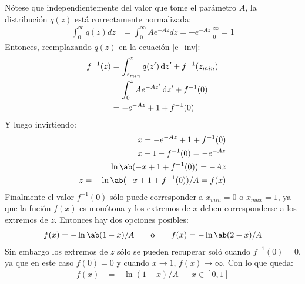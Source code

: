\documentclass[12pt]{article}
\begin{document}
Nótese que independientemente del valor que tome el parámetro $A$, la
distribución $q(z)$ está correctamente normalizada:
 \begin{align}
  \int_{0}^{\infty}q(z)dz&=\int_{0}^{\infty}Ae^{-Az}dz=-e^{-Az}\bigg\rvert_0^\infty=1
\end{align}  
Entonces, reemplazando $q(z)$ en la ecuación \ref{e_inv}:
\begin{align}
  f^{-1}(z)&=\int_{z_{min}}^{z} q(z') \odif{z'}+f^{-1}(z_{min})\\
            &=\int_{0}^{z} Ae^{-Az'} \odif{z'}+f^{-1}(0)\\
            &=-e^{-Az}+1+f^{-1}(0)
\end{align} 
Y luego invirtiendo:
\begin{align}
  x=-e^{-Az}+1+f^{-1}(0)\\
  x-1-f^{-1}(0)=-e^{-Az}\\
  \ln\ab(-x+1+f^{-1}(0))=-Az\\
  z=-\ln\ab(-x+1+f^{-1}(0))/A=f(x)
\end{align}
Finalmente el valor $f^{-1}(0)$ sólo puede corresponder a $x_{min}=0$ o
$x_{max}=1$, ya que la fución $f(x)$ es monótona y los extremos de $x$ deben
corresponderse a los extremos de $z$. Entonces hay dos opciones posibles:
\begin{align}
   f(x)=-\ln\ab(1-x)/A\quad &&\text{o}&& \quad f(x)=-\ln\ab(2-x)/A
\end{align}
Sin embargo los extremos de $z$ sólo se pueden recuperar soló cuando
$f^{-1}(0)=0$, ya que en este caso $f(0)=0$ y cuando $x\rightarrow1$,
$f(x)\rightarrow\infty$. Con lo que queda:
\begin{align}
   f(x)&=-\ln(1-x)/A  && x\in[0,1]
\end{align}


\printbibliography

\end{document}
